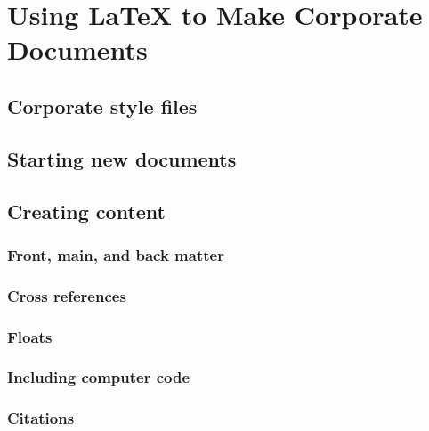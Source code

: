\section{Using LaTeX to Make Corporate Documents}


\subsection{Corporate style files}
\label{sec:CorporateCls}


\subsection{Starting new documents}
\label{sec:NewDocs}


\subsection{Creating content}
\subsubsection{Front, main, and back matter}


\subsubsection{Cross references}
\label{sec:References}


\subsubsection{Floats}
\label{sec:Floats}


\subsubsection{Including computer code}
\label{sec:Codes}


\subsubsection{Citations}
\label{sec:Citations}


